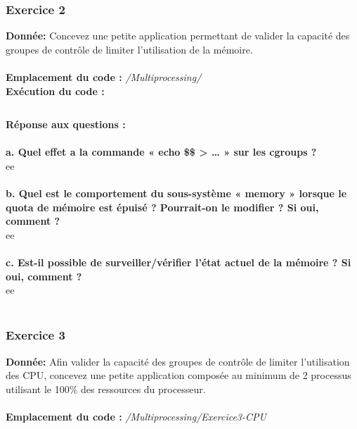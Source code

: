 \subsubsection{Exercice 2}
\textbf{Donnée:} Concevez	une	petite	application	permettant	de	valider	la	capacité	des	groupes	de	contrôle	de	limiter	
l’utilisation	de	la mémoire.	\\\\

\textbf{Emplacement du code : } \textit{/Multiprocessing/}\\

\textbf{Exécution du code : } \\
\begin{lstlisting}

\end{lstlisting}

\textbf{Réponse aux questions :}\\\\
\textbf{a. Quel	effet	a	la	commande	 « echo \$\$ > … »	sur	les	cgroups ?}\\
ee\\\\
\textbf{b. Quel	est	le	comportement	du	sous-système	« memory »	lorsque	le	quota	de	mémoire	est	
	épuisé ?	Pourrait-on	le	modifier ?	Si	oui,	comment ?}\\
ee\\\\
\textbf{c. Est-il	possible	de	surveiller/vérifier l’état	actuel	de	la	mémoire ?	Si	oui,	comment ?}\\
ee\\\\

\subsubsection{Exercice 3}
\textbf{Donnée:} Afin	valider	la	capacité	des	groupes	de	contrôle	de	limiter	l’utilisation	des	CPU,	concevez	une	petite	application	composée	au	minimum	de	2	processus	utilisant	le	100\%	des	ressources	du	processeur.	\\\\

\textbf{Emplacement du code : } \textit{/Multiprocessing/Exercice3-CPU}\\

